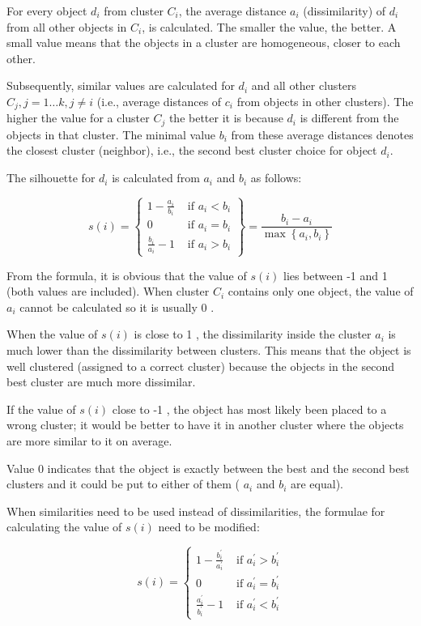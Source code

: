 For every object $d_{i}$ from cluster $C_{i}$, the average distance $a_{i}$ (dissimilarity) of $d_{i}$ from all other objects in $C_{i}$, is calculated. The smaller the value, the better. A small value means that the objects in a cluster are homogeneous, closer to each other.

Subsequently, similar values are calculated for $d_{i}$ and all other clusters $C_{j}, j=1 \ldots k, j \neq i$ (i.e., average distances of $c_{i}$ from objects in other clusters). The higher the value for a cluster $C_{j}$ the better it is because $d_{i}$ is different from the objects in that cluster. The minimal value $b_{i}$ from these average distances denotes the closest cluster (neighbor), i.e., the second best cluster choice for object $d_{i}$.

The silhouette for $d_{i}$ is calculated from $a_{i}$ and $b_{i}$ as follows:

\[
s(i)=\left\{\begin{array}{ll}
1-\frac{a_{i}}{b_{i}} & \text { if } a_{i}<b_{i}  \tag{12.55}\\
0 & \text { if } a_{i}=b_{i} \\
\frac{b_{i}}{a_{i}}-1 & \text { if } a_{i}>b_{i}
\end{array}\right\}=\frac{b_{i}-a_{i}}{\max \left\{a_{i}, b_{i}\right\}}
\]

From the formula, it is obvious that the value of $s(i)$ lies between -1 and 1 (both values are included). When cluster $C_{i}$ contains only one object, the value of $a_{i}$ cannot be calculated so it is usually 0 .

When the value of $s(i)$ is close to 1 , the dissimilarity inside the cluster $a_{i}$ is much lower than the dissimilarity between clusters. This means that the object is well clustered (assigned to a correct cluster) because the objects in the second best cluster are much more dissimilar.

If the value of $s(i)$ close to -1 , the object has most likely been placed to a wrong cluster; it would be better to have it in another cluster where the objects are more similar to it on average.

Value 0 indicates that the object is exactly between the best and the second best clusters and it could be put to either of them ( $a_{i}$ and $b_{i}$ are equal).

When similarities need to be used instead of dissimilarities, the formulae for calculating the value of $s(i)$ need to be modified:

\[
s(i)= \begin{cases}1-\frac{b_{i}^{\prime}}{a_{i}^{\prime}} & \text { if } a_{i}^{\prime}>b_{i}^{\prime}  \tag{12.56}\\ 0 & \text { if } a_{i}^{\prime}=b_{i}^{\prime} \\ \frac{a_{i}^{\prime}}{b_{i}^{\prime}}-1 & \text { if } a_{i}^{\prime}<b_{i}^{\prime}\end{cases}
\]

